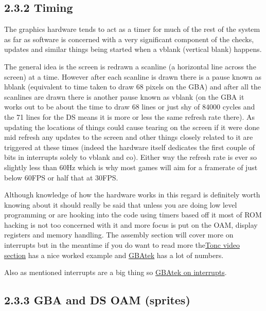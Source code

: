\documentclass[
]{book}
\begin{document}
\hypertarget{timing}{%
\subsection{2.3.2 Timing}\label{timing}}

The graphics hardware tends to act as a timer for much of the rest of the system as far as software is concerned with a very significant component of the checks, updates and similar things being started when a vblank (vertical blank) happens.

The general idea is the screen is redrawn a scanline (a horizontal line across the screen) at a time. However after each scanline is drawn there is a pause known as hblank (equivalent to time taken to draw 68 pixels on the GBA) and after all the scanlines are drawn there is another pause known as vblank (on the GBA it works out to be about the time to draw 68 lines or just shy of 84000 cycles and the 71 lines for the DS means it is more or less the same refresh rate there). As updating the locations of things could cause tearing on the screen if it were done mid refresh any updates to the screen and other things closely related to it are triggered at these times (indeed the hardware itself dedicates the first couple of bits in interrupts solely to vblank and co). Either way the refresh rate is ever so slightly less than 60Hz which is why most games will aim for a framerate of just below 60FPS or half that at 30FPS.

Although knowledge of how the hardware works in this regard is definitely worth knowing about it should really be said that unless you are doing low level programming or are hooking into the code using timers based off it most of ROM hacking is not too concerned with it and more focus is put on the OAM, display registers and memory handling. The assembly section will cover more on interrupts but in the meantime if you do want to read more the\href{http://www.coranac.com/tonc/text/video.htm}{Tonc video section} has a nice worked example and \href{http://problemkaputt.de/gbatek.htm\#lcddimensionsandtimings}{GBAtek} has a lot of numbers.

Also as mentioned interrupts are a big thing so \href{http://problemkaputt.de/gbatek.htm\#gbainterruptcontrol}{GBAtek on interrupts}.

\hypertarget{gba-and-ds-oam-sprites}{%
\subsection{2.3.3 GBA and DS OAM (sprites)}\label{gba-and-ds-oam-sprites}}
\end{document}
